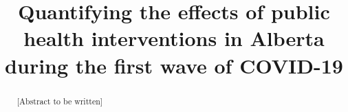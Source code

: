 \documentclass{elsarticle}
\begin{document}
\title{Quantifying the effects of public health interventions in Alberta during the first wave of COVID-19}


\begin{abstract}
[Abstract to be written]
\end{abstract}

\maketitle
\end{document}
